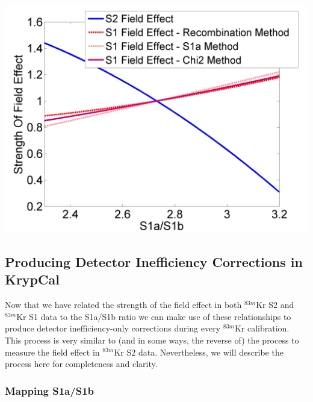 \documentclass[a4paper,12pt]{article}
\begin{document}
{\begin{center}
\includegraphics[scale=0.6]{Run04Corrections/StrengthOfFieldEffectOverlay.png}
 \label{AllMeasurements}
\end{center}

\subsection{Producing Detector Inefficiency Corrections in KrypCal} \label{KrypCalCode}

Now that we have related the strength of the field effect in both $^{83m}$Kr S2 and $^{83m}$Kr S1 data to the S1a/S1b ratio we can make use of these relationships to produce detector inefficiency-only corrections during every $^{83m}$Kr calibration.  This process is very similar to (and in some ways, the reverse of) the process to measure the field effect in $^{83m}$Kr S2 data. Nevertheless, we will describe the process here for completeness and clarity.

\subsubsection{Mapping S1a/S1b}

}
\end{document}
